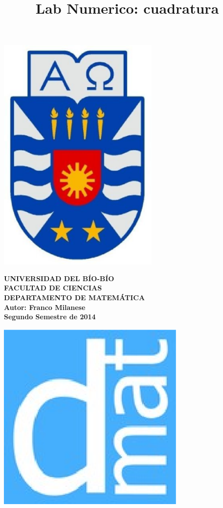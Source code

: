 \documentclass[12pt,letterpaper]{article}
\begin{document}
\title{Lab Numerico: cuadratura}
{\begin{minipage}{2cm}
\hspace*{1cm}\includegraphics[width=0.6\textwidth]{escubo-ubb.eps}
\end{minipage}
\begin{minipage}{12cm}
\small
{\bf \rm
{\hspace*{3.1cm} {\footnotesize UNIVERSIDAD DEL B\'IO-B\'IO} \\
 \hspace*{3.7cm} {\scriptsize FACULTAD DE CIENCIAS}  \\
  \hspace*{2.9cm} {\scriptsize DEPARTAMENTO DE MATEM\'ATICA}  \\
\hspace*{3.75cm} {\scriptsize Autor: Franco Milanese}\\
\hspace*{3.75cm} {\scriptsize Segundo Semestre de 2014}}}
\end{minipage}}
{\begin{minipage}{2cm}
\hspace*{-0.5cm}\vspace*{-0.05cm}\includegraphics[width=0.7\textwidth]{escudo-dmat.eps}
\end{minipage}}
\end{document}
